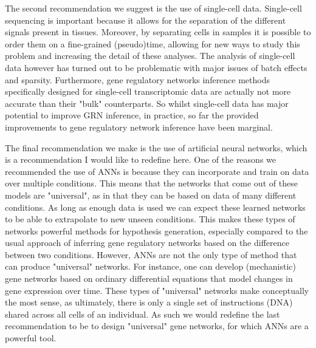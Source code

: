 The second recommendation we suggest is the use of single-cell data. Single-cell sequencing is important because it allows for the separation of the different signals present in tissues. Moreover, by separating cells in samples it is possible to order them on a fine-grained (pseudo)time\cite{Saelens2019}, allowing for new ways to study this problem and increasing the detail of these analyses. The analysis of single-cell data however has turned out to be problematic with major issues of batch effects \cite{Tran2020,Haghverdi2018,Lhnemann2020} and sparsity\cite{Lhnemann2020,Bouland2023}. Furthermore, gene regulatory networks inference methods specifically designed for single-cell transcriptomic data are actually not more accurate than their "bulk" counterparts\cite{Chen_2018}. So whilst single-cell data has major potential to improve GRN inference, in practice, so far the provided improvements to gene regulatory network inference have been marginal. 

The final recommendation we make is the use of artificial neural networks, which is a recommendation I would like to redefine here. One of the reasons we recommended the use of ANNs is because they can incorporate and train on data over multiple conditions. This means that the networks that come out of these models are "universal", as in that they can be based on data of many different conditions. As long as enough data is used we can expect these learned networks to be able to extrapolate to new unseen conditions\cite{Schreiber2020_avocado}. This makes these types of networks powerful methods for hypothesis generation, especially compared to the usual approach of inferring gene regulatory networks based on the difference between two conditions. However, ANNs are not the only type of method that can produce "universal" networks. For instance, one can develop (mechanistic) gene networks based on ordinary differential equations that model changes in gene expression over time\cite{Ventre_2022}. These types of "universal" networks make conceptually the most sense, as ultimately, there is only a single set of instructions (DNA) shared across all cells of an individual. As such we would redefine the last recommendation to be to design "universal" gene networks, for which ANNs are a powerful tool.


